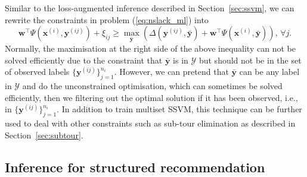 Similar to the loss-augmented inference described in Section~\ref{sec:ssvm}, 
we can rewrite the constraints in problem (\ref{eq:nslack_ml}) into
\begin{equation*}
\mathbf{w}^\top \Psi(\mathbf{x}^{(i)}, \mathbf{y}^{(ij)}) + \xi_{ij} \ge 
\max_{\bar{\mathbf{y}}} \left( \Delta(\mathbf{y}^{(ij)}, \bar{\mathbf{y}}) + \mathbf{w}^\top \Psi(\mathbf{x}^{(i)}, \bar{\mathbf{y}}) \right),
\, \forall j.
\end{equation*} 
Normally, the maximisation at the right side of the above inequality can not be solved efficiently due to the constraint that 
$\bar{\mathbf{y}}$ is in $\mathcal{Y}$ but should not be in the set of observed labels $\{\mathbf{y}^{(ij)}\}_{j=1}^{n_i}$.
However, we can pretend that $\bar{\mathbf{y}}$ can be any label in $\mathcal{Y}$ and do the unconstrained optimisation,
which can sometimes be solved efficiently, then we filtering out the optimal solution if it has been observed, 
i.e., in $\{\mathbf{y}^{(ij)}\}_{j=1}^{n_i}$. 
In addition to train multiset SSVM, this technique can be further used to deal with other constraints such as sub-tour elimination 
as described in Section~\ref{sec:subtour}.


\subsection{Inference for structured recommendation}
\label{sec:SRinf}

